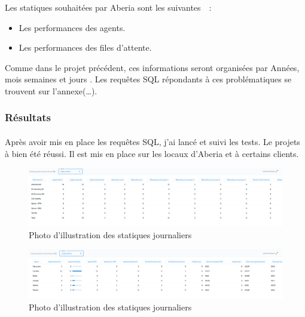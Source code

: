 \documentclass[a4paper,12pt]{report}
\begin{document}
       Les statiques souhaitées par Aberia sont les suivantes  : 
\begin{itemize}
 \item Les performances des agents.
 \item Les performances des files d’attente.\newline 
\end{itemize}

       Comme dans le projet précédent, ces informations seront organisées par  Années, mois semaines et  jours . Les requêtes SQL répondants à ces problématiques se trouvent sur l’annexe(…). 
\subsubsection{Résultats}

\paragraph*{}
                   Après avoir mis en place les requêtes SQL, j’ai lancé et suivi les tests.\newline 
                   Le projets à bien été réussi. Il est mis en place sur les locaux d’Aberia et à certains clients. 

\begin{figure}[!h]
\begin{center}
\includegraphics[width=20cm]{image/PROJET2a.png}
\end{center}
\caption{Photo d'illustration des statiques journaliers}
\label{Photo d'illustration}
\end{figure}

\begin{figure}[!h]
\begin{center}
\includegraphics[width=20cm]{image/projet2b.png}
\end{center}
\caption{Photo d'illustration des statiques journaliers}
\label{Photo d'illustration}
\end{figure}
\end{document}
